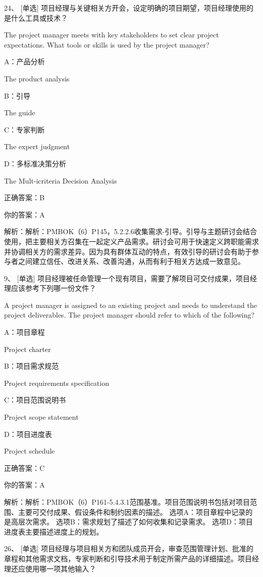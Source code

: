 24、 [单选] 项目经理与关键相关方开会，设定明确的项目期望，项目经理使用的是什么工具或技术？

The project manager meets with key stakeholders to set clear project expectations. What tools or skills is used by the project manager?

A：产品分析

The product analysis

B：引导

The guide

C：专家判断

The expert judgment

D：多标准决策分析

The Mult-icriteria Decision Analysis

正确答案：B

你的答案：A

解析：解析：PMBOK（6）P145，5.2.2.6收集需求-引导。引导与主题研讨会结合使用，把主要相关方召集在一起定义产品需求。研讨会可用于快速定义跨职能需求并协调相关方的需求差异。因为具有群体互动的特点，有效引导的研讨会有助于参与者之间建立信任、改进关系、改善沟通，从而有利于相关方达成一致意见。



9、 [单选] 项目经理被任命管理一个现有项目，需要了解项目可交付成果，项目经理应该参考下列哪一份文件？

A project manager is assigned to an existing project and needs to understand the project deliverables. The project manager should refer to which of the following?

A：项目章程

Project charter

B：项目需求规范

Project requirements specification

C：项目范围说明书

Project scope statement

D：项目进度表

Project schedule

正确答案：C

你的答案：A

解析：解析：PMBOK（6）P161-5.4.3.1范围基准。项目范围说明书包括对项目范围、主要可交付成果、假设条件和制约因素的描述。 选项A：项目章程中记录的是高层次需求。 选项B：需求规划了描述了如何收集和记录需求。 选项D：项目进度表主要描述进度上的规划。


26、 [单选] 项目经理与项目相关方和团队成员开会，审查范围管理计划、批准的章程和其他需求文档，专家判断和引导技术用于制定所需产品的详细描述。项目经理还应使用哪一项其他输入？

